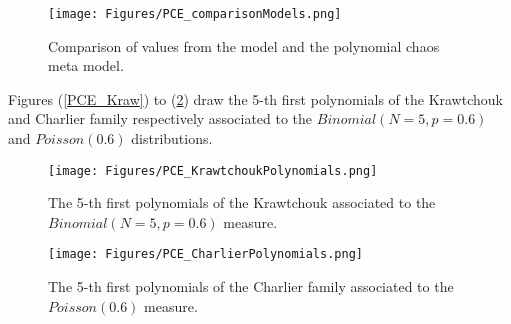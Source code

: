              \begin{figure}[H]
               \begin{center}
                 \texttt{[image: Figures/PCE\_comparisonModels.png]}
                 \caption{Comparison of values from the model and the polynomial chaos meta model.}
                 \label{ModelsComparison}
               \end{center}
             \end{figure}


             Figures (\ref{PCE_Kraw}) to (\ref{PCE_Char}) draw the  5-th first polynomials of the Krawtchouk and Charlier  family respectively associated to the $Binomial(N=5,p=0.6)$ and $Poisson(0.6)$ distributions.



             \begin{figure}[H]
               \begin{minipage}{9cm}
                 \begin{center}
                   \texttt{[image: Figures/PCE\_KrawtchoukPolynomials.png]}
                   \caption{The 5-th first polynomials of the Krawtchouk associated to the  $Binomial(N=5,p=0.6)$ measure.}
                   \label{PCE_Kraw}
                 \end{center}
               \end{minipage}
               \hfill
               \begin{minipage}{9cm}
                 \begin{center}
                   \texttt{[image: Figures/PCE\_CharlierPolynomials.png]}
                   \caption{The 5-th first polynomials of the Charlier  family associated to the $Poisson(0.6)$ measure.}
                   \label{PCE_Char}
                 \end{center}
               \end{minipage}
             \end{figure}
